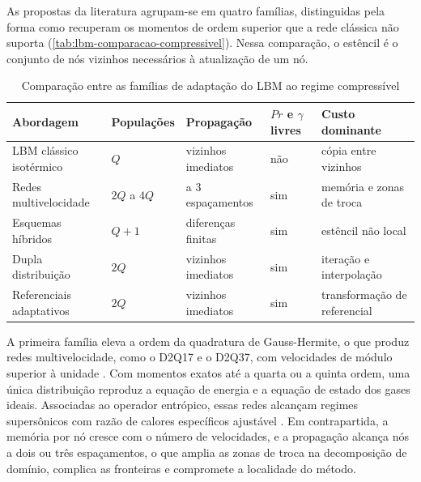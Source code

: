 As propostas da literatura agrupam-se em quatro famílias, distinguidas pela forma como recuperam os momentos de ordem superior que a rede clássica não suporta (\autoref{tab:lbm-comparacao-compressivel}).
Nessa comparação, o estêncil é o conjunto de nós vizinhos necessários à atualização de um nó.

\begin{table}[H]
    \centering
    \caption{Comparação entre as famílias de adaptação do LBM ao regime compressível}
    \label{tab:lbm-comparacao-compressivel}
    \footnotesize
    \setlength{\tabcolsep}{4pt}
    \begin{tabularx}{\linewidth}{>{\raggedright\arraybackslash}p{4.3cm}>{\centering\arraybackslash}p{1.9cm}>{\raggedright\arraybackslash}X>{\centering\arraybackslash}p{2.4cm}>{\raggedright\arraybackslash}X}
        \toprule
        Abordagem & Populações & Propagação & $Pr$ e $\gamma$ livres & Custo dominante \\
        \midrule
        LBM clássico isotérmico  & $Q$         & vizinhos imediatos    & não & cópia entre vizinhos \\
        Redes multivelocidade    & $2Q$ a $4Q$ & 2 a 3 espaçamentos    & sim & memória e zonas de troca \\
        Esquemas híbridos        & $Q + 1$     & diferenças finitas    & sim & estêncil não local \\
        Dupla distribuição       & $2Q$        & vizinhos imediatos    & sim & iteração e interpolação \\
        Referenciais adaptativos & $2Q$        & vizinhos imediatos    & sim & transformação de referencial \\
        \bottomrule
    \end{tabularx}
\end{table}

A primeira família eleva a ordem da quadratura de Gauss-Hermite, o que produz redes multivelocidade, como o D2Q17 e o D2Q37, com velocidades de módulo superior à unidade \parencite{Shan2006}.
Com momentos exatos até a quarta ou a quinta ordem, uma única distribuição reproduz a equação de energia e a equação de estado dos gases ideais.
Associadas ao operador entrópico, essas redes alcançam regimes supersônicos com razão de calores específicos ajustável \parencite{Frapolli2015}.
Em contrapartida, a memória por nó cresce com o número de velocidades, e a propagação alcança nós a dois ou três espaçamentos, o que amplia as zonas de troca na decomposição de domínio, complica as fronteiras e compromete a localidade do método.

